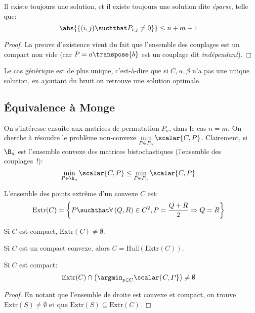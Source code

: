 \documentclass[info, math, french]{mpb-cours}
\begin{document}
\begin{proposition}
	Il existe toujours une solution, et il existe toujours une solution dite \emph{éparse}, telle que:
	\begin{equation*}
		\abs{\left\{(i, j) \suchthat P_{i, j}\neq 0\right\}} \leq n + m - 1
	\end{equation*}
\end{proposition}
\begin{proof}
	La preuve d'existence vient du fait que l'ensemble des couplages est un compact non vide (car $P = a\transpose{b}$ est un couplage dit \emph{indépendant}).
\end{proof}
Le cas générique est de plus unique, c'est-à-dire que si $C, \alpha, \beta$ n'a pas une unique solution, en ajoutant du bruit on retrouve une solution optimale.

\subsection{Équivalence à Monge}

On s'intéresse ensuite aux matrices de permutation $P_{n}$, dans le cas $n = m$.
On cherche à résoudre le problème non-convexe $\displaystyle\min_{P\in P_{n}} \scalar{C, P}$.
Clairement, si $\B_{n}$ est l'ensemble convexe des matrices bistochastiques (l'ensemble des couplages~!):
\begin{equation*}
	\min_{P \in \B_{n}} \scalar{C, P} \leq \min_{P \in P_{n}}\scalar{C, P}
\end{equation*}

\begin{definition}
	L'ensemble des points extrême d'un convexe $C$ est:
	\begin{equation*}
		\mathrm{Extr}(C) = \left\{P \suchthat \forall \left(Q, R\right) \in C^{2}, P = \frac{Q + R}{2} \Rightarrow Q = R\right\}
	\end{equation*}
\end{definition}

\begin{thm}
	Si $C$ est compact, $\mathrm{Extr}(C) \neq \emptyset$.
\end{thm}

\begin{thm}
	Si $C$ est un compact convexe, alors $C = \mathrm{Hull}\left(\mathrm{Extr}\left(C\right)\right)$.
\end{thm}

\begin{proposition}
	Si $C$ est compact:
	\begin{equation*}
		\mathrm{Extr}(C) \cap \left(\argmin_{p\in C} \scalar{C, P}\right) \neq \emptyset
	\end{equation*}
\end{proposition}
\begin{proof}
	En notant que l'ensemble de droite est convexe et compact, on trouve $\mathrm{Extr}(S) \neq \emptyset$ et que
	$\mathrm{Extr}(S) \subseteq \mathrm{Extr}(C)$.
\end{proof}
\end{document}

